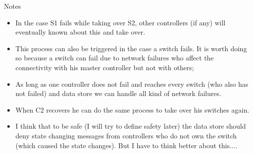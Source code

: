 Notes
\begin{itemize}
\item In the case S1 fails while taking over S2, other controllers (if any) will eventually known about this and take over. 
\item This process can also be triggered in the case a switch fails. It is worth doing so because a switch can fail due to network failures who affect the connectivity with his master controller but not with others; 
\item As long as one  controller does not fail and reaches every switch (who also has not failed)  and data store we can handle all kind of network failures.
\item When C2 recovers he can do the same process to take over his switches again. 
\item I think that to be safe (I will try to define safety later) the data store should deny state changing messages from controllers who do not own the switch (which caused the state changes). But I have to think better about this.... 
\end{itemize}






